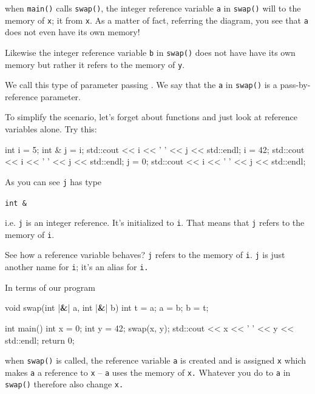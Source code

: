 when \texttt{main()} calls \texttt{swap()}, the integer reference variable \texttt{a} in \texttt{swap()} will  to the memory of \texttt{x}; it  from \texttt{x}. As a matter of fact, referring the diagram, you see that \texttt{a} does not even have its own memory!

Likewise the integer reference variable \texttt{b} in \texttt{swap()} does not have have its own memory but rather it refers to the memory of \texttt{y}.

We call this type of parameter passing . We say that the \texttt{a} in \texttt{swap()} is a pass-by-reference parameter.

To simplify the scenario, let's forget about functions and just look at reference variables alone. Try this:

\begin{consolethree}[escapeinside=||]
int i = 5;
int & j = i;
std::cout << i << ' ' << j << std::endl;
i = 42;
std::cout << i << ' ' << j << std::endl;
j = 0;
std::cout << i << ' ' << j << std::endl;
\end{consolethree}

As you can see \texttt{j} has type

\texttt{int \&}

i.e. \texttt{j} is an integer reference. It's initialized to \texttt{i}. That means that \texttt{j} refers to the memory of \texttt{i}.


See how a reference variable behaves? \texttt{j} refers to the memory of \texttt{i}. \texttt{j} is just another name for \texttt{i}; it's an alias for \texttt{i.}

In terms of our program

\begin{consolethree}[escapeinside=||]
void swap(int |\textbf{\&}| a, int |\textbf{\&}| b)
{
    int t = a;
    a = b;
    b = t;
}

int main()
{
    int x = 0;
    int y = 42;
    swap(x, y);
    std::cout << x << ' ' << y << std::endl;
    return 0;
}
\end{consolethree}

when \texttt{swap()} is called, the reference variable \texttt{a} is created and is assigned \texttt{x} which makes \texttt{a} a reference to \texttt{x} -- \texttt{a} uses the memory of \texttt{x.} Whatever you do to \texttt{a} in \texttt{swap()} therefore also change \texttt{x.}

